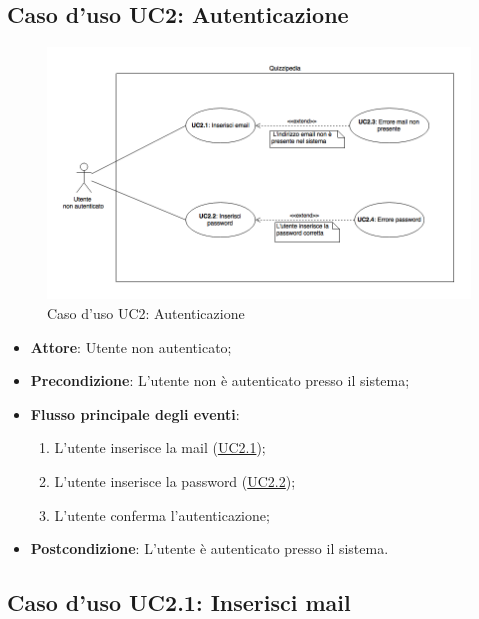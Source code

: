 \documentclass[12pt,a4paper]{article}
\begin{document}
\subsection{Caso d'uso UC2: Autenticazione}
\begin{figure}[H]
	\centering
	\includegraphics[width=\textwidth]{../img/diagramUC2.png}
	\caption{Caso d'uso UC2: Autenticazione}\label{fig:UC2} 
\end{figure}
\begin{itemize}

\item \textbf{Attore}: Utente non autenticato; 
\item \textbf{Precondizione}: L'utente non è autenticato presso il sistema;

\item \textbf{Flusso principale degli eventi}:
\begin{enumerate}
	\item L'utente inserisce la mail (\hyperlink{UC2.1}{UC2.1});
	\item L'utente inserisce la password (\hyperlink{UC2.2}{UC2.2});
	\item L'utente conferma l'autenticazione;
	
\end{enumerate}
\item \textbf{Postcondizione}: L'utente è autenticato presso il sistema.
\end{itemize}
\hypertarget{UC2.1}{}
\subsection{Caso d'uso UC2.1: Inserisci mail}
\end{document}

